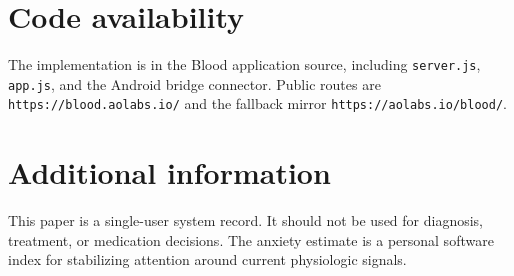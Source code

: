 \documentclass[12pt,letterpaper]{article}
\begin{document}
\section{Code availability}

The implementation is in the Blood application source, including \texttt{server.js}, \texttt{app.js}, and the Android bridge connector. Public routes are \texttt{https://blood.aolabs.io/} and the fallback mirror \texttt{https://aolabs.io/blood/}.

\section{Additional information}

This paper is a single-user system record. It should not be used for diagnosis, treatment, or medication decisions. The anxiety estimate is a personal software index for stabilizing attention around current physiologic signals.

\printbibliography
\end{document}
